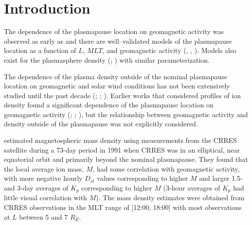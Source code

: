 \documentclass[draft,linenumbers]{agujournal}
\begin{document}
\section{Introduction}


The dependence of the plasmapause location on geomagnetic activity was observed as early as \citet{Carpenter1966} and there are well--validated models of the plasmapause location as a function of $L$, $MLT$, and geomagnetic activity (\citet{LemaireEarthsPlasmasphere}, \citet{Moldwin2002ModelPlasmapause}, \citet{OBrien2003EmpiricalPlasmapause}).  Models also exist for the plasmasphere density (\citet{Gallagher1988EmpiricalModelPlasmasphere}; \citet{LemaireEarthsPlasmasphere}) with similar parameterization.

The dependence of the plasma density outside of the nominal plasmapause location on geomagnetic and solar wind conditions has not been extensively studied until the past decade (\citet{Takahashi2006}; \citet{Takahashi2010}; \citet{Denton2016}). Earlier works that considered profiles of ion density found a significant dependence of the plasmapause location on geomagnetic activity (\citet{Chappell1970}; \citet{Maynard1977}; \citet{Carpenter1992}), but the relationship between geomagnetic activity and density outside of the plasmapause was not explicitly considered.

\citet{Takahashi2006} estimated magnetospheric mass density using measurements from the CRRES satellite during a 73-day period in 1991 when CRRES was in an elliptical, near equatorial orbit and primarily beyond the nominal plasmapause. They found that the local average ion mass, $M$, had some correlation with geomagnetic activity, with more negative hourly $D_{st}$ values corresponding to higher $M$ and larger 1.5- and 3-day averages of $K_p$ corresponding to higher $M$ (3-hour averages of $K_p$ had little visual correlation with $M$). The mass density estimates were obtained from CRRES observations in the MLT range of [12:00, 18:00] with most observations at $L$ between 5 and 7 $R_E$.
\end{document}
